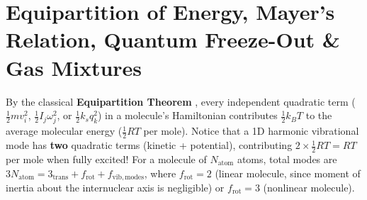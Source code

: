 \section{Equipartition of Energy, Mayer's Relation, Quantum Freeze-Out \& Gas Mixtures}\label{sec:06.5}

By the classical \textbf{Equipartition Theorem} , every independent quadratic term ($\frac{1}{2}mv_i^2$, $\frac{1}{2}I_j\omega_j^2$, or $\frac{1}{2}k_s q_k^2$) in a molecule's Hamiltonian contributes $\frac{1}{2}k_B T$ to the average molecular energy ($\frac{1}{2}RT$ per mole). Notice that a 1D harmonic vibrational mode has \textbf{two} quadratic terms (kinetic + potential), contributing $2\times\frac{1}{2}RT = RT$ per mole when fully excited! For a molecule of $N_{\mathrm{atom}}$ atoms, total modes are $3N_{\mathrm{atom}} = 3_{\mathrm{trans}} + f_{\mathrm{rot}} + f_{\mathrm{vib,modes}}$, where $f_{\mathrm{rot}} = 2$ (linear molecule, since moment of inertia about the internuclear axis is negligible) or $f_{\mathrm{rot}} = 3$ (nonlinear molecule).

